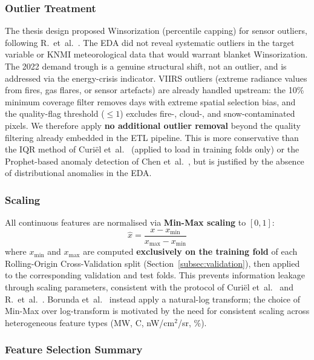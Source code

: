 \subsubsection{Outlier Treatment}
\label{subsubsec:outliers}

The thesis design proposed Winsorization (percentile capping) for sensor outliers, following R.~et~al.~\cite{r_forecasting_2025}. The EDA did not reveal systematic outliers in the target variable or KNMI meteorological data that would warrant blanket Winsorization. The 2022 demand trough is a genuine structural shift, not an outlier, and is addressed via the energy-crisis indicator. VIIRS outliers (extreme radiance values from fires, gas flares, or sensor artefacts) are already handled upstream: the 10\% minimum coverage filter removes days with extreme spatial selection bias, and the quality-flag threshold ($\leq 1$) excludes fire-, cloud-, and snow-contaminated pixels. We therefore apply \textbf{no additional outlier removal} beyond the quality filtering already embedded in the ETL pipeline. This is more conservative than the IQR method of Curi\"el et~al.~\cite{curiel_integrating_2025} (applied to load in training folds only) or the Prophet-based anomaly detection of Chen et~al.~\cite{chen_monthly_2025}, but is justified by the absence of distributional anomalies in the EDA.

\subsubsection{Scaling}
\label{subsubsec:scaling}

All continuous features are normalised via \textbf{Min-Max scaling} to $[0, 1]$:
\begin{equation}
    \hat{x} = \frac{x - x_{\min}}{x_{\max} - x_{\min}}
\end{equation}
where $x_{\min}$ and $x_{\max}$ are computed \textbf{exclusively on the training fold} of each Rolling-Origin Cross-Validation split (Section~\ref{subsec:validation}), then applied to the corresponding validation and test folds. This prevents information leakage through scaling parameters, consistent with the protocol of Curi\"el et~al.~\cite{curiel_integrating_2025} and R.~et~al.~\cite{r_forecasting_2025}. Borunda et~al.~\cite{borunda_machine_2025} instead apply a natural-log transform; the choice of Min-Max over log-transform is motivated by the need for consistent scaling across heterogeneous feature types (MW, \textdegree C, nW/cm$^2$/sr, \%).

\subsubsection{Feature Selection Summary}
\label{subsubsec:feature_selection}

